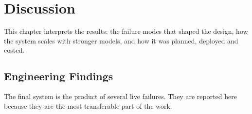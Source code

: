 \chapter{Discussion}
\label{ch:discussion}

This chapter interprets the results: the failure modes that shaped the design, how the system scales with stronger models, and how it was planned, deployed and costed.

\section{Engineering Findings}
\label{sec:discussion}

The final system is the product of several live failures. They are reported here
because they are the most transferable part of the work.

